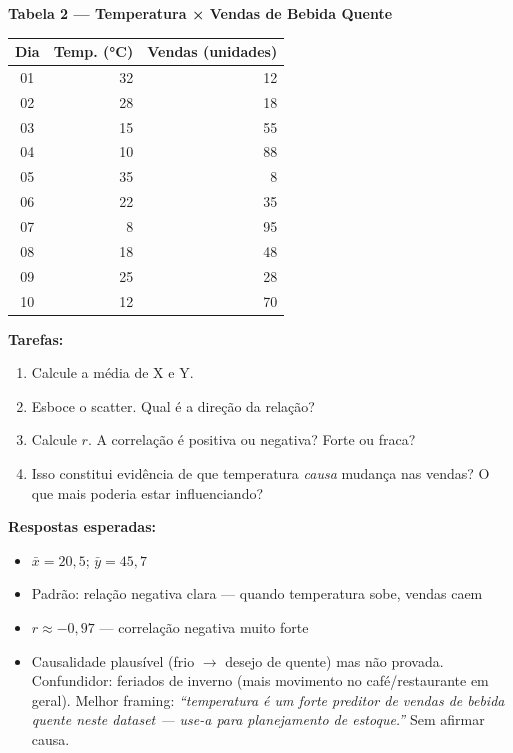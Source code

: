 \begin{BoardBox}
\textbf{Tabela 2 — Temperatura × Vendas de Bebida Quente}

\medskip
\begin{tabular}{|c|r|r|}
\hline
\textbf{Dia} & \textbf{Temp. (°C)} & \textbf{Vendas (unidades)} \\
\hline
01 & 32 & 12  \\
02 & 28 & 18  \\
03 & 15 & 55  \\
04 & 10 & 88  \\
05 & 35 & 8   \\
06 & 22 & 35  \\
07 & 8  & 95  \\
08 & 18 & 48  \\
09 & 25 & 28  \\
10 & 12 & 70  \\
\hline
\end{tabular}

\medskip
\textbf{Tarefas:}
\begin{enumerate}
  \item Calcule a média de X e Y.
  \item Esboce o scatter. Qual é a direção da relação?
  \item Calcule $r$. A correlação é positiva ou negativa? Forte ou fraca?
  \item Isso constitui evidência de que temperatura \emph{causa} mudança nas vendas?
  O que mais poderia estar influenciando?
\end{enumerate}

\textbf{Respostas esperadas:}
\begin{itemize}
  \item $\bar{x} = 20{,}5$; $\bar{y} = 45{,}7$
  \item Padrão: relação negativa clara — quando temperatura sobe, vendas caem
  \item $r \approx -0{,}97$ — correlação negativa muito forte
  \item Causalidade plausível (frio $\to$ desejo de quente) mas não provada.
  Confundidor: feriados de inverno (mais movimento no café/restaurante em geral).
  Melhor framing: \textit{``temperatura é um forte preditor de vendas de bebida
  quente neste dataset — use-a para planejamento de estoque.''} Sem afirmar causa.
\end{itemize}
\end{BoardBox}

